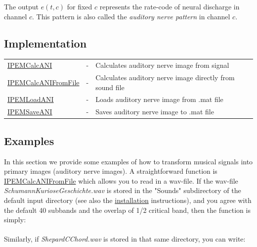 The output $e(t,c)$ for fixed $c$ represents the rate-code of
neural discharge in channel $c$. This pattern is also called the
\emph{auditory nerve pattern} in channel $c$.

\subsection{Implementation}

\begin{tabularx}{\linewidth}{llX}
\hyperlink{FuncRef:IPEMCalcANI}{IPEMCalcANI} & - & Calculates auditory nerve image from signal\\
\hyperlink{FuncRef:IPEMCalcANIFromFile}{IPEMCalcANIFromFile} & - & Calculates auditory nerve image directly from sound file\\
\hyperlink{FuncRef:IPEMLoadANI}{IPEMLoadANI} & - & Loads auditory nerve image from .mat file\\
\hyperlink{FuncRef:IPEMSaveANI}{IPEMSaveANI} & - & Saves auditory nerve image to .mat file\\
\end{tabularx}

\subsection{Examples}

In this section we provide some examples of how to transform
musical signals into primary images (auditory nerve images). A
straightforward function is
\hyperlink{FuncRef:IPEMCalcANIFromFile}{IPEMCalcANIFromFile} which
allows you to read in a wav-file. If the wav-file
\emph{SchumannKurioseGeschichte.wav} is stored in the "Sounds"
subdirectory of the default input directory (see also the
\hyperlink{ReferenceManual:Installation}{installation}
instructions), and you agree with the default 40 subbands and the
overlap of 1/2 critical band, then the function is simply:\\

\\

Similarly, if \emph{ShepardCChord.wav} is stored in that same directory, you can write:\\

\\

